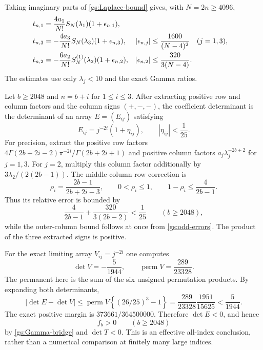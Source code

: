Taking imaginary parts of \eqref{gs:Laplace-bound} gives, with
$N=2n\ge4096$,
\begin{align}
 t_{n,1}&=\frac{4a_1}{N!}S_N(\lambda_1)(1+\epsilon_{n,1}),\notag\\
 t_{n,3}&=-\frac{4a_3}{N!}S_N(\lambda_3)(1+\epsilon_{n,3}),
 &|\epsilon_{n,j}|&\le\frac{1600}{(N-4)^2}\quad(j=1,3),
 \label{gs:odd-errors}\\
 t_{n,2}&=-\frac{6a_2}{N!}S_N^{(1)}(\lambda_2)(1+\epsilon_{n,2}),
 &|\epsilon_{n,2}|&\le\frac{320}{3(N-4)}.
 \label{gs:even-error}
\end{align}
The estimates use only $\lambda_j<10$ and the exact Gamma ratios.

Let $b\ge2048$ and $n=b+i$ for $1\le i\le3$.
After extracting positive row and column factors and the column
signs $(+,-,-)$, the coefficient determinant is the determinant of
an array $E=(E_{ij})$ satisfying
\begin{equation}\label{gs:relative-matrix}
 E_{ij}=j^{-2i}(1+\eta_{ij}),\qquad |\eta_{ij}|<\frac1{25}.
\end{equation}
For precision, extract the positive row factors
$4\Gamma(2b+2i-2)\pi^{-2i}/\Gamma(2b+2i+1)$ and positive column
factors $a_j\lambda_j^{-2b+2}$ for $j=1,3$.
For $j=2$, multiply this column factor additionally by
$3\lambda_2/(2(2b-1))$.
The middle-column row correction is
\[
 \rho_i=\frac{2b-1}{2b+2i-3},\qquad
 0<\rho_i\le1,\qquad1-\rho_i\le\frac4{2b-1}.
\]
Thus its relative error is bounded by
\[
 \frac4{2b-1}+\frac{320}{3(2b-2)}<\frac1{25}\qquad(b\ge2048),
\]
while the outer-column bound follows at once from
\eqref{gs:odd-errors}.  The product of the three extracted signs is
positive.

For the exact limiting array $V_{ij}=j^{-2i}$ one computes
\begin{equation}\label{gs:V}
 \det V=-\frac5{1944},\qquad
 \operatorname{perm}V=\frac{289}{23328}.
\end{equation}
The permanent here is the sum of the six unsigned permutation
products.  By expanding both determinants,
\[
 |\det E-\det V|
 \le\operatorname{perm}V\left\{(26/25)^3-1\right\}
 =\frac{289}{23328}\frac{1951}{15625}<\frac5{1944}.
\]
The exact positive margin is $373661/364500000$.
Therefore $\det E<0$, and hence
\begin{equation}\label{gs:large-positive}
                         f_b>0\qquad(b\ge2048)
\end{equation}
by \eqref{gs:Gamma-bridge} and $\det T<0$.
This is an effective all-index conclusion, rather than a numerical
comparison at finitely many large indices.

